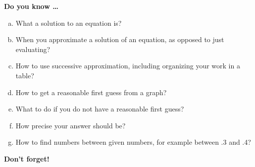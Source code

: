 
\newpage



\bigskip

\noindent \textbf{Do you know \ldots} %

\begin{enumerate} [(a)]
\item What a solution to an equation is? 
\item When you approximate a solution of an equation, as opposed to just evaluating? 
\item How to use successive approximation, including organizing your work in a table? 
\item How to get a reasonable first guess from a graph? 
\item What to do if you do not have a reasonable first guess? 
\item How precise your answer should be? 
\item How to find numbers between given numbers, for example between .3 and .4? 
\end{enumerate}

\bigskip

\noindent \textbf{Don't forget!}
